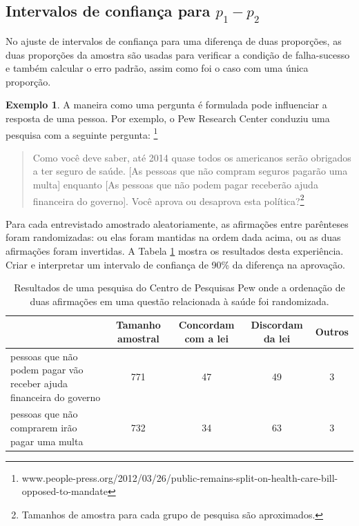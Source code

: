 \documentclass[
]{book}
\theoremstyle{definition}
\theoremstyle{definition}
\newtheorem{example}{Exemplo}[chapter]
\theoremstyle{definition}
\theoremstyle{definition}
\theoremstyle{remark}
\begin{document}
\hypertarget{CIDifference}{%
\subsection{\texorpdfstring{Intervalos de confiança para \(p_1-p_2\)}{Intervalos de confiança para p\_1-p\_2}}\label{CIDifference}}

No ajuste de intervalos de confiança para uma diferença de duas proporções, as duas proporções da amostra são usadas para verificar a condição de falha-sucesso e também calcular o erro padrão, assim como foi o caso com uma única proporção.

\begin{example}
\protect\hypertarget{exm:unnamed-chunk-231}{}{\label{exm:unnamed-chunk-231} }A maneira como uma pergunta é formulada pode influenciar a resposta de uma pessoa. Por exemplo, o Pew Research Center conduziu uma pesquisa com a seguinte pergunta: \footnote{www.people-press.org/2012/03/26/public-remains-split-on-health-care-bill-opposed-to-mandate}
\end{example}

\begin{quote}
Como você deve saber, até 2014 quase todos os americanos serão obrigados a ter seguro de saúde. {[}As pessoas que não compram seguros pagarão uma multa{]} enquanto {[}As pessoas que não podem pagar receberão ajuda financeira do governo{]}. Você aprova ou desaprova esta política?\footnote{Tamanhos de amostra para cada grupo de pesquisa são aproximados.}
\end{quote}

Para cada entrevistado amostrado aleatoriamente, as afirmações entre parênteses foram randomizadas: ou elas foram mantidas na ordem dada acima, ou as duas afirmações foram invertidas. A Tabela \ref{tab:pewPollResultsForRandomizedStatementOrdering} mostra os resultados desta experiência. Criar e interpretar um intervalo de confiança de 90\% da diferença na aprovação.

\begin{table}

\caption{\label{tab:pewPollResultsForRandomizedStatementOrdering} Resultados de uma pesquisa do Centro de Pesquisas Pew onde a ordenação de duas afirmações em uma questão relacionada à saúde foi randomizada.}
\centering
\begin{tabular}[t]{l|c|c|c|c}
\hline
  & Tamanho amostral & Concordam com a lei & Discordam da lei & Outros\\
\hline
pessoas que não podem pagar vão receber ajuda financeira do governo & 771 & 47 & 49 & 3\\
\hline
pessoas que não comprarem irão pagar uma multa & 732 & 34 & 63 & 3\\
\hline
\end{tabular}
\end{table}
\end{document}
